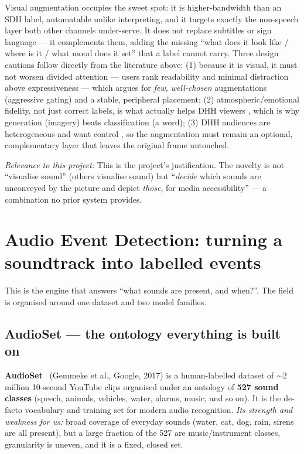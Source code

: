 \documentclass[11pt,a4paper]{article}
\newcommand{\rel}[1]{\smallskip\noindent\textit{Relevance to this project:} #1}
\begin{document}
\noindent Visual augmentation occupies the sweet spot: it is higher-bandwidth than an SDH label,
automatable unlike interpreting, and it targets exactly the non-speech layer both other channels
under-serve. It does not replace subtitles or sign language --- it complements them, adding the
missing ``what does it look like / where is it / what mood does it set'' that a label cannot carry.
Three design cautions follow directly from the literature above: (1) because it is visual, it must not
worsen divided attention --- users rank readability and minimal distraction above expressiveness
\cite{captionroyale} --- which argues for \emph{few, well-chosen} augmentations (aggressive gating) and
a stable, peripheral placement; (2) atmospheric/emotional fidelity, not just correct labels, is what
actually helps DHH viewers \cite{choices}, which is why generation (imagery) beats classification (a
word); (3) DHH audiences are heterogeneous and want control \cite{emotivecaptions,choices}, so the
augmentation must remain an optional, complementary layer that leaves the original frame untouched.

\rel{This is the project's justification. The novelty is not ``visualise sound'' (others visualise
sound) but ``\emph{decide} which sounds are unconveyed by the picture and depict \emph{those}, for
media accessibility'' --- a combination no prior system provides.}

\section{Audio Event Detection: turning a soundtrack into labelled events}
This is the engine that answers ``what sounds are present, and when?''. The field is organised around
one dataset and two model families.

\subsection{AudioSet --- the ontology everything is built on}
\textbf{AudioSet}~\cite{audioset} (Gemmeke et al., Google, 2017) is a human-labelled dataset of
$\sim$2\,million 10-second YouTube clips organised under an ontology of \textbf{527 sound classes}
(speech, animals, vehicles, water, alarms, music, and so on). It is the de-facto vocabulary and
training set for modern audio recognition. \emph{Its strength and weakness for us:} broad coverage of
everyday sounds (water, cat, dog, rain, sirens are all present), but a large fraction of the 527 are
music/instrument classes, granularity is uneven, and it is a fixed, closed set.
\end{document}
